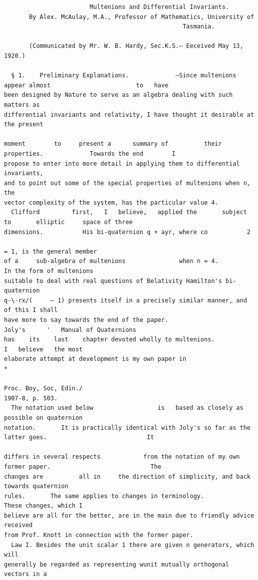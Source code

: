 \documentclass[10pt]{article}
\begin{document}
\begin{verbatim}
                        Multenions and Differential Invariants.
       By Alex. McAulay, M.A., Professor of Mathematics, University of
                                                  Tasmania.

       (Communicated by Mr. W. B. Hardy, Sec.K.S.— Eeceived May 13, 1920.)

  § 1.    Preliminary Explanations.             —Since multenions appear almost                        to   have
been designed by Nature to serve as an algebra dealing with such matters as
differential invariants and relativity, I have thought it desirable at the present

moment        to     present a      summary of          their   properties.             Towards the end        I
propose to enter into more detail in applying them to differential invariants,
and to point out some of the special properties of multenions when n, the
vector complexity of the system, has the particular value 4.
  Clifford         first,   I   believe,   applied the       subject     to       elliptic     space of three
dimensions.           His bi-quaternion q + ayr, where co           2
                                                                        = 1, is the general member
of a     sub-algebra of multenions               when n = 4.            In the form of multenions
suitable to deal with real questions of Belativity Hamilton's bi-quaternion
q-\-rx/(     — 1) presents itself in a precisely similar manner, and of this I shall
have more to say towards the end of the paper.                    Joly's      '   Manual of Quaternions
has    its    last    chapter devoted wholly to multenions.                             I   believe   the most
elaborate attempt at development is my own paper in                               *
                                                                                      Proc. Boy, Soc, Edin./
1907-8, p. 503.
  The notation used below                  is   based as closely as possible on quaternion
notation.       It is practically identical with Joly's so far as the latter goes.                            It

differs in several respects            from the notation of my own former paper.                            The
changes are          all in     the direction of simplicity, and back towards quaternion
rules.       The same applies to changes in terminology.                          These changes, which I
believe are all for the better, are in the main due to friendly advice received
from Prof. Knott in connection with the former paper.
  Law I. Besides the unit scalar 1 there are given n generators, which will
generally be regarded as representing wunit mutually orthogonal vectors in a


\end{verbatim}
\end{document}
